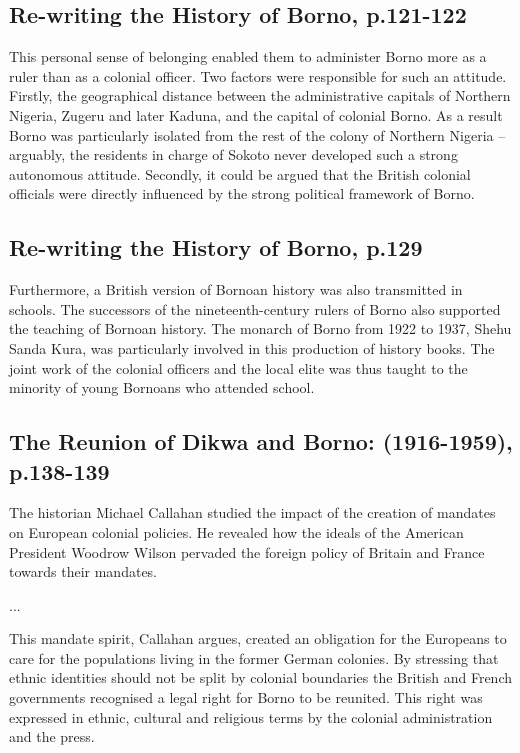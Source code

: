 \documentclass[12pt]{article}
\begin{document}
\subsection{Re-writing the History of Borno, p.121-122}

This personal sense of belonging enabled them to administer Borno more as a
ruler than as a colonial officer. Two factors were responsible for such an
attitude. Firstly, the geographical distance between the administrative capitals
of Northern Nigeria, Zugeru and later Kaduna, and the capital of colonial Borno.
As a result Borno was particularly isolated from the rest of the colony of
Northern Nigeria -- arguably, the residents in charge of Sokoto never developed
such a strong autonomous attitude. Secondly, it could be argued that the British
colonial officials were directly influenced by the strong political framework of
Borno.

\subsection{Re-writing the History of Borno, p.129}

Furthermore, a British version of Bornoan history was also transmitted in
schools. The successors of the nineteenth-century rulers of Borno also supported
the teaching of Bornoan history. The monarch of Borno from 1922 to 1937, Shehu
Sanda Kura, was particularly involved in this production of history books. The
joint work of the colonial officers and the local elite was thus taught to the
minority of young Bornoans who attended school.

\subsection{The Reunion of Dikwa and Borno: (1916-1959), p.138-139}

The historian Michael Callahan studied the impact of the creation of mandates on
European colonial policies. He revealed how the ideals of the American President
Woodrow Wilson pervaded the foreign policy of Britain and France towards their
mandates.

...

This mandate spirit, Callahan argues, created an obligation for the Europeans to
care for the populations living in the former German colonies. By stressing that
ethnic identities should not be split by colonial boundaries the British and
French governments recognised a legal right for Borno to be reunited. This right
was expressed in ethnic, cultural and religious terms by the colonial
administration and the press.
\end{document}
